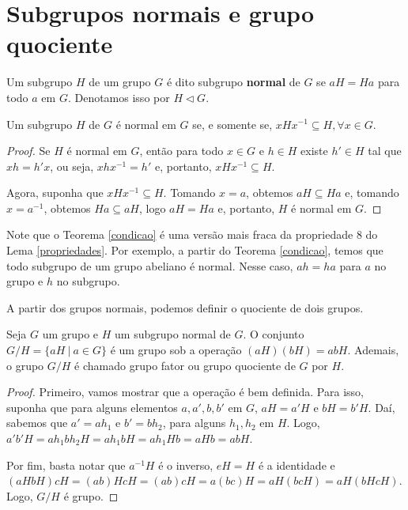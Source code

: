 \section{Subgrupos normais e grupo quociente}
\label{sec-subgrupos-normais}
    \begin{definition}
    \label{def:subgrupo-normal}
		Um subgrupo $H$ de um grupo $G$ é dito subgrupo \textbf{normal} de $G$ se 
		$aH = Ha$ para todo $a$ em $G$. Denotamos isso por $H\vartriangleleft G$.
	\end{definition}
	\begin{theorem}
	\label{condicao}
		Um subgrupo $H$ de $G$ é normal em $G$ se, e somente se, $xHx^{-1}\subseteq H, \forall x\in G$. 
	\end{theorem} 
	\begin{proof}
		Se $H$ é normal em $G$, então para todo $x\in G$ e $h\in H$ existe $h'\in H$ tal que 
		$xh = h'x$, ou seja, $xhx^{-1} = h'$ e, portanto, $xHx^{-1}\subseteq H.$
		\par\vspace{0.3cm} Agora, suponha que $xHx^{-1}\subseteq H$. Tomando $x=a$, obtemos 
		$aH\subseteq Ha$ e, tomando $x = a^{-1}$, obtemos $Ha\subseteq aH$, logo $aH = Ha$ e, 
		portanto, $H$ é normal em $G$.
	\end{proof}
	Note que o Teorema \ref{condicao} é uma versão mais fraca da propriedade 8 
	do Lema \ref{propriedades}. Por exemplo, a partir do Teorema \ref{condicao}, temos que todo 
	subgrupo de um grupo abeliano é normal. Nesse caso, $ah = ha$ para $a$ no grupo e $h$ no subgrupo. 
	\par\vspace{0.3cm} A partir dos grupos normais, podemos definir o quociente de dois grupos.
	\begin{theorem}
	\label{quociente}
		Seja $G$ um grupo e $H$ um subgrupo normal de $G$. O conjunto $G/H = \{ aH \ | \ a\in G \}$ 
		é um grupo sob a operação $(aH)(bH) = abH$. Ademais, o grupo $G/H$ é chamado grupo fator 
		ou grupo quociente de $G$ por $H$.
	\end{theorem}
	\begin{proof}
		Primeiro, vamos mostrar que a operação é bem definida. Para isso, suponha que para alguns 
		elementos $a, a', b, b'$ em $G$, $aH = a'H$ e $bH = b'H$. Daí, sabemos que $a' = ah_1$ e 
		$b' = bh_2$, para alguns $h_1, h_2$ em $H$. Logo, $a'b'H = ah_1bh_2H = ah_1bH = ah_1Hb = aHb = abH$. 
		\par\vspace{0.3cm} Por fim, basta notar que $a^{-1}H$ é o inverso, $eH = H$ é a identidade e 
		$(aHbH)cH = (ab)HcH = (ab)cH = a(bc)H = aH(bcH) = aH(bHcH)$. Logo, $G/H$ é grupo.
	\end{proof}
